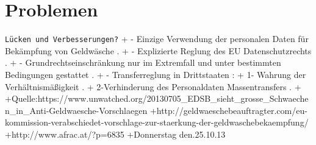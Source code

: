 \documentclass{article}
\begin{document}
    \section[Probleme]{Problemen}

        \texttt{Lücken und Verbesserungen?}
        +        - Einzige Verwendung der personalen Daten für Bekämpfung von Geldwäsche .
+        - Explizierte Reglung des EU Datenschutzrechts .
+        - Grundrechtseinschränkung nur im Extremfall und unter bestimmten Bedingungen gestattet .
+        - Transferreglung in Drittstaaten :
+                1- Wahrung der Verhältnismäßigkeit .
+                2-Verhinderung des Personaldaten Massentransfers .
+                
+Quelle:https://www.unwatched.org/20130705_EDSB_sieht_grosse_Schwaechen_in_Anti-Geldwaesche-Vorschlaegen
+http://geldwaeschebeauftragter.com/eu-kommission-verabschiedet-vorschlage-zur-staerkung-der-geldwaschebekaempfung/
+http://www.afrac.at/?p=6835
+Donnerstag den.25.10.13
\end{document}
